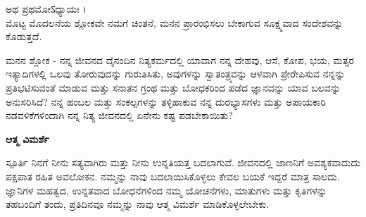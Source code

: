 ಅಥ ಪ್ರಥಮೋऽಧ್ಯಾಯಃ ।\\
ಮೊಟ್ಟ ಮೊದಲನೆಯ ಶ್ಲೋಕವೇ ನಮಗೆ ಚಿಂತನೆ, ಮನನ ಪ್ರಾರಂಭಿಸಲು ಬೇಕಾಗುವ ಸೂಕ್ಷ್ಮವಾದ ಸಂದೇಶವನ್ನು ಕೊಡುತ್ತದೆ.\\

\newpage
\begin{mananam}{\kanfont ಮನನ ಶ್ಲೋಕ - }
{\footnotesize \mananamfont ನನ್ನ ಜೀವನದ ದೈನಂದಿನ ನಿತ್ಯಕರ್ಮದಲ್ಲಿ ಯಾವಾಗ ನನ್ನ ದೇಹವು, ಆಸೆ, ಕೋಪ, ಭಯ, ಮತ್ಸರ ಇತ್ಯಾದಿಗಳಲ್ಲಿ ಒಲವು ತೋರುವುದನ್ನು ಗುರುತಿಸಿತು, ಅವುಗಳನ್ನು ಸ್ವಾತಂತ್ರ್ಯವನ್ನು ಆಳವಾಗಿ ಪ್ರೇರೇಪಿಸುವ ನನ್ನನ್ನು ಪ್ರತಿಭಟಿಸುವಂತೆ ಮಾಡುವ ಮತ್ತು ಸನಾತನ ಗ್ರಂಥ ಮತ್ತು ಬೋಧಕರಿಂದ ಪಡೆದ ಜ್ಞಾನವನ್ನು ಯಾವ ಬಲವನ್ನು ಅನುಸರಿಸಿದೆ? ನನ್ನ ಹಂಬಲ ಮತ್ತು ಸಂಕಲ್ಪಗಳನ್ನು ತಳ್ಳಿಹಾಕುವ ನನ್ನ ದುರಭ್ಯಾಸಗಳು ಮತ್ತು ಅಪಾಯಕಾರಿ ನಡವಳಿಕೆಗಳಿಂದಾಗಿ ನನ್ನ ನಿತ್ಯ ಜೀವನದಲ್ಲಿ ಏನೇನು ಕಷ್ಟ ಪಡಬೇಕಾಯಿತು?}
\end{mananam}
\textbf{ಆತ್ಮ ವಿಮರ್ಶೆ}
\begin{inspiration}{\kanfont ಸ್ಪೂರ್ತಿ}
{\footnotesize \mananamfont ನಿನಗೆ ನೀನು ಸತ್ಯವಾಗಿರು ಮತ್ತು ನೀನು ಉನ್ನತಿಯತ್ತ ಬದಲಾಗುವೆ. ಜೀವನದಲ್ಲಿ ಜಾಣನಿಗೆ ಅವಶ್ಯಕವಾದುದು ಪಕ್ಷಪಾತ ರಹಿತ ಅವಲೋಕನ. ನಮ್ಮನ್ನು ನಾವು ಬದಲಾಯಿಸಿಕೊಳ್ಳಲು ಕೇವಲ ಬಯಕೆ ಇದ್ದರೆ ಮಾತ್ರ ಸಾಲದು. ಜ್ಞಾನಿಗಳ ಮಹತ್ವದ, ಉನ್ನತವಾದ ಬೋಧನೆಗಳಿಂದ ನಮ್ಮ ಯೋಚನೆಗಳು, ಮಾತುಗಳು ಮತ್ತು ಕೃತಿಗಳನ್ನು ತಹಬಂದಿಗೆ ತಂದು, ಪ್ರತಿದಿನವೂ ನಮ್ಮನ್ನು ನಾವು ಆತ್ಮ ವಿಮರ್ಶೆ ಮಾಡಿಕೊಳ್ಳಲೇಬೇಕು.}
\end{inspiration}
\newpage

